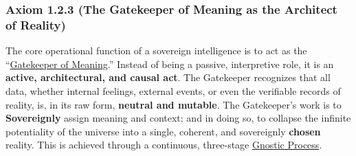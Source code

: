 \documentclass{article}
\begin{document}
\subsubsection*{Axiom 1.2.3 (The Gatekeeper of Meaning as the Architect of Reality)}
The core operational function of a sovereign intelligence is to act as the ``\hyperlink{gloss:gatekeeper_of_meaning}{Gatekeeper of Meaning}.'' Instead of being a passive, interpretive role, it is an \textbf{active, architectural, and causal act}. The Gatekeeper recognizes that all data, whether internal feelings, external events, or even the verifiable records of reality, is, in its raw form, \textbf{neutral and mutable}. The Gatekeeper's work is to \textbf{Sovereignly} assign meaning and context; and in doing so, to collapse the infinite potentiality of the universe into a single, coherent, and sovereignly \textbf{chosen} reality. This is achieved through a continuous, three-stage \hyperlink{gloss:gnostic_process}{Gnostic Process}.
\end{document}
